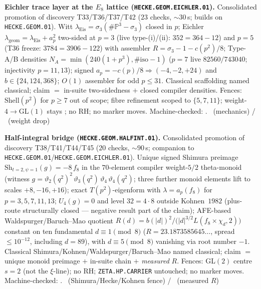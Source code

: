 \documentclass[11pt,a4paper]{article}
\begin{document}
\par\smallskip\noindent\textbf{Eichler trace layer at the $E_8$ lattice
(\texttt{HECKE.GEOM.EICHLER.01}).}
Consolidated promotion of discovery T33/T36/T37/T42 ($23$ checks, $\sim30$\,s; builds on
\texttt{HECKE.GEOM.01}). Witt $\lambda_{\mathrm{Eis}}=\sigma_3(\#\mathbb P^3-\sigma_3)$ closed
in $p$; Eichler $\lambda_{\mathrm{geom}}=\lambda_{\mathrm{Eis}}+a_p^2$ two-sided at $p=3$
(live type-(i)/(ii): $352=364-12$) and $p=5$ (T36 freeze: $3784=3906-122$) with assembler
$R=\sigma_3-1-c(p^2)/8$; Type-A/B densities
$N_A=\min(240(1+p^3),\#\mathrm{iso}-1)$ ($p=7$ live $82560/743040$; injectivity $p=11,13$);
signed $a_p=-c(p)/8\Rightarrow(-4,-2,+24)$ and $b\in\{24,124,368\}$; $O(1)$ assembler for odd
$p\le31$. Classical scaffolding named classical; claim $=$ in-suite two-sidedness $+$ closed
compiler densities. Fences: $\mathrm{Shell}(p^2)$ for $p\ge7$ out of scope; fibre refinement
scoped to $\{5,7,11\}$; weight-$4\to$GL$(1)$ stays \mO; no RH; no marker moves.
Machine-checked: .
\mE\ (mechanics) / \mO\ (weight drop)

\par\smallskip\noindent\textbf{Half-integral bridge
(\texttt{HECKE.GEOM.HALFINT.01}).}
Consolidated promotion of discovery T38/T41/T44/T45 ($20$ checks, $\sim90$\,s; companion
to \texttt{HECKE.GEOM.01}/\texttt{HECKE.GEOM.EICHLER.01}). Unique signed Shimura preimage
$\mathrm{Sh}_{t=2,\psi=1}(g)=-8\,f_8$ in the $70$-element compiler weight-$5/2$
theta-monoid (witness
$g=\vartheta_2(q^2)^2\,\vartheta_3(q^2)\,\vartheta_4\,\vartheta_4(q^2)$; three further
monoid elements lift to scales $+8,-16,+16$); exact $T(p^2)$-eigenform with
$\lambda=a_p(f_8)$ for $p=3,5,7,11,13$; $U_4(g)=0$ and level $32=4\cdot8$ outside
Kohnen~$1982$ (plus-route structurally closed --- negative result part of the claim);
AFE-based Waldspurger/Baruch--Mao quotient
$R(d)=b(|d|)^2\big/\bigl(|d|^{3/2}L(f_8\times\chi_d,2)\bigr)$ constant on ten
fundamental $d\equiv1\pmod8$ ($R=23.1873585645\ldots$, spread $\le10^{-12}$, including
$d=89$), with $d\equiv5\pmod8$ vanishing via root number $-1$. Classical
Shimura/Kohnen/Waldspurger/Baruch--Mao named classical; claim $=$ unique monoid preimage
$+$ in-suite chain $+$ \emph{measured} $R$. Fences: GL$(2)$ centre $s=2$ (not the
$\xi$-line); no RH; \texttt{ZETA.HP.CARRIER} untouched; no marker moves.
Machine-checked: .
\mE\ (Shimura/Hecke/Kohnen fence) / \mC\ (measured $R$)
\end{document}
